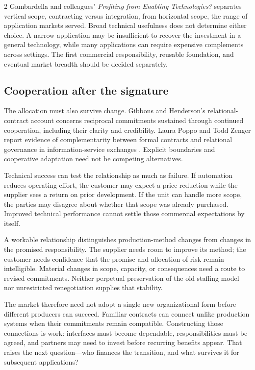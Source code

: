 \begin{multicols}{2}
Gambardella and colleagues' \emph{Profiting from Enabling Technologies?}
\citep{gambardella2021enabling} separates vertical scope, contracting
versus integration, from horizontal scope, the range of application
markets served. Broad technical usefulness does not determine either
choice. A narrow application may be insufficient to recover the
investment in a general technology, while many applications can require
expensive complements across settings. The first commercial
responsibility, reusable foundation, and eventual market breadth should
be decided separately.

\subsection{Cooperation after the
signature}\label{cooperation-after-the-signature}

The allocation must also survive change. Gibbons and Henderson's
relational-contract account \citep{gibbons2012contracts} concerns
reciprocal commitments sustained through continued cooperation,
including their clarity and credibility. Laura Poppo and Todd Zenger
report evidence of complementarity between formal contracts and
relational governance in information-service exchanges
\citep{poppo2002contracts}. Explicit boundaries and cooperative
adaptation need not be competing alternatives.

Technical success can test the relationship as much as failure. If
automation reduces operating effort, the customer may expect a price
reduction while the supplier sees a return on prior development. If the
unit can handle more scope, the parties may disagree about whether that
scope was already purchased. Improved technical performance cannot
settle those commercial expectations by itself.

A workable relationship distinguishes production-method changes from
changes in the promised responsibility. The supplier needs room to
improve its method; the customer needs confidence that the promise and
allocation of risk remain intelligible. Material changes in scope,
capacity, or consequences need a route to revised commitments. Neither
perpetual preservation of the old staffing model nor unrestricted
renegotiation supplies that stability.

The market therefore need not adopt a single new organizational form
before different producers can succeed. Familiar contracts can connect
unlike production systems when their commitments remain compatible.
Constructing those connections is work: interfaces must become
dependable, responsibilities must be agreed, and partners may need to
invest before recurring benefits appear. That raises the next
question---who finances the transition, and what survives it for
subsequent applications?

\end{multicols}

